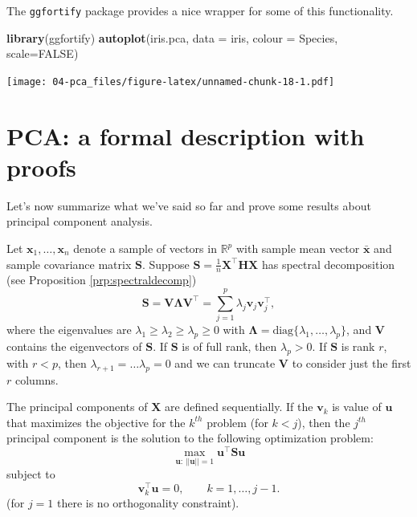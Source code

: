 \documentclass[
]{book}
\newenvironment{Shaded}{\begin{snugshade}}{\end{snugshade}}
\newcommand{\AttributeTok}[1]{\textcolor[rgb]{0.13,0.29,0.53}{#1}}
\newcommand{\ConstantTok}[1]{\textcolor[rgb]{0.56,0.35,0.01}{#1}}
\newcommand{\FunctionTok}[1]{\textcolor[rgb]{0.13,0.29,0.53}{\textbf{#1}}}
\newcommand{\NormalTok}[1]{#1}
\newcommand{\StringTok}[1]{\textcolor[rgb]{0.31,0.60,0.02}{#1}}
\theoremstyle{definition}
\theoremstyle{definition}
\theoremstyle{definition}
\theoremstyle{definition}
\theoremstyle{remark}
\begin{document}
The \texttt{ggfortify} package provides a nice wrapper for some of this functionality.

\begin{Shaded}
\begin{Highlighting}[]
\FunctionTok{library}\NormalTok{(ggfortify)}
\FunctionTok{autoplot}\NormalTok{(iris.pca, }\AttributeTok{data =}\NormalTok{ iris, }\AttributeTok{colour =} \StringTok{\textquotesingle{}Species\textquotesingle{}}\NormalTok{, }\AttributeTok{scale=}\ConstantTok{FALSE}\NormalTok{)}
\end{Highlighting}
\end{Shaded}

\texttt{[image: 04-pca\_files/figure-latex/unnamed-chunk-18-1.pdf]}

\hypertarget{pca-a-formal-description-with-proofs}{%
\section{PCA: a formal description with proofs}\label{pca-a-formal-description-with-proofs}}

Let's now summarize what we've said so far and prove some results about principal component analysis.

Let \(\mathbf x_1, \ldots , \mathbf x_n\) denote a sample of vectors in \(\mathbb{R}^p\) with sample mean vector \(\bar{\mathbf x}\) and sample covariance matrix \(\mathbf S\). Suppose \(\mathbf S=\frac{1}{n}\mathbf X^\top \mathbf H\mathbf X\) has spectral decomposition (see Proposition \ref{prp:spectraldecomp})
\begin{equation}
\mathbf S=\mathbf V\boldsymbol \Lambda\mathbf V^\top = \sum_{j=1}^p  \lambda_j \mathbf v_j \mathbf v_j^\top,
\label{eq:pcaspect}
\end{equation}
where the eigenvalues are \(\lambda_1 \geq \lambda_2 \geq \lambda_p \geq 0\) with \(\boldsymbol \Lambda=\text{diag}\{\lambda_1, \ldots, \lambda_p\}\), and \(\mathbf V\) contains the eigenvectors of \(\mathbf S\). If \(\mathbf S\) is of full rank, then \(\lambda_p>0\). If \(\mathbf S\) is rank \(r\), with \(r<p\), then \(\lambda_{r+1}=\ldots \lambda_p=0\) and we can truncate \(\mathbf V\) to consider just the first \(r\) columns.

The principal components of \(\mathbf X\) are defined sequentially. If the \(\mathbf v_k\) is value of \(\mathbf u\) that maximizes the objective for the \(k^{th}\) problem (for \(k<j\)), then the \(j^{th}\) principal component is the solution to the following optimization problem:
\begin{equation}
\max_{\mathbf u: \, \vert \vert \mathbf u\vert \vert =1}\mathbf u^\top \mathbf S\mathbf u
\label{eq:pcmaxgen}
\end{equation}
subject to
\begin{equation}
\mathbf v_k^\top \mathbf u=0, \qquad k=1, \ldots , j-1.
\label{eq:pccongen}
\end{equation}
(for \(j=1\) there is no orthogonality constraint).
\end{document}
